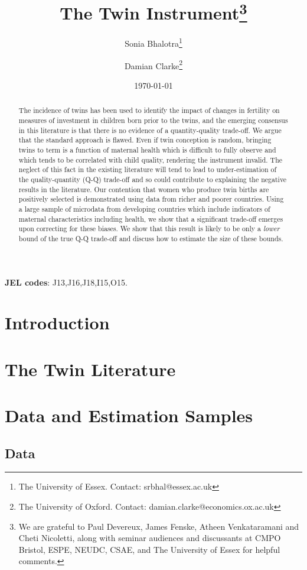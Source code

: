 \documentclass{article}[11pt,subeqn]
\title{The Twin Instrument\footnote{We are grateful to Paul Devereux, James Fenske, 
Atheen Venkataramani and Cheti Nicoletti, along with seminar audiences and discussants 
at CMPO Bristol, ESPE, NEUDC, CSAE, and The University of Essex for helpful comments.}}
\author{Sonia Bhalotra\thanks{The University of Essex.  Contact: srbhal@essex.ac.uk} 
\and Damian Clarke\thanks{The University of Oxford.  Contact: damian.clarke@economics.ox.ac.uk}}
\date{\today}
\begin{document}
\begin{spacing}{1.4}

\maketitle
\begin{abstract}
 The incidence of twins has been used to identify the impact of changes in fertility 
 on measures of investment in children born prior to the twins, and the emerging 
 consensus in this literature is that there is no evidence of a quantity-quality 
 trade-off. We argue that the standard approach is flawed. Even if twin conception 
 is random, bringing twins to term is a function of maternal health which is difficult 
 to fully observe and which tends to be correlated with child quality, rendering the 
 instrument invalid. The neglect of this fact in the existing literature will tend to 
 lead to under-estimation of the quality-quantity (Q-Q) trade-off and so could 
 contribute to explaining the negative results in the literature. Our contention that 
 women who produce twin births are positively selected is demonstrated using data from 
 richer and poorer countries. Using a large sample of microdata from developing 
 countries which include indicators of maternal characteristics including health, we 
 show that a significant trade-off emerges upon correcting for these biases. We show 
 that this result is likely to be only a \emph{lower} bound of the true Q-Q trade-off 
 and discuss how to estimate the size of these bounds.
 \\
\end{abstract}

\hspace{4mm}\textbf{\small JEL codes}: J13,J16,J18,I15,O15. \\
\newpage
\section{Introduction}


\section{The Twin Literature}


\section{Data and Estimation Samples}
\subsection{Data}



\end{spacing}
\end{document}
